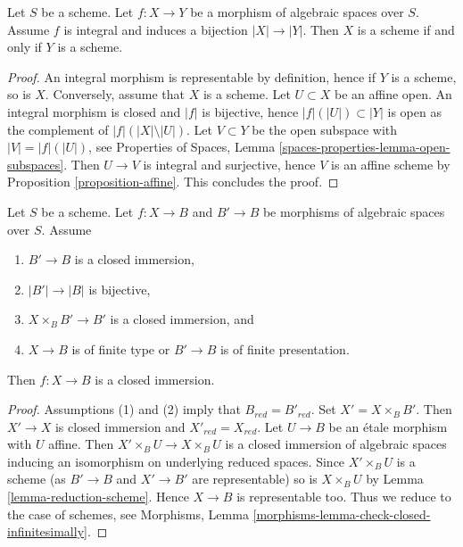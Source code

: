 \begin{lemma}
\label{lemma-integral-universally-bijective-scheme}
Let $S$ be a scheme. Let $f : X \to Y$ be a morphism of algebraic spaces
over $S$. Assume $f$ is integral and induces a bijection $|X| \to |Y|$.
Then $X$ is a scheme if and only if $Y$ is a scheme.
\end{lemma}

\begin{proof}
An integral morphism is representable by definition, hence if $Y$
is a scheme, so is $X$. Conversely, assume that $X$ is a scheme.
Let $U \subset X$ be an affine open. An integral morphism is
closed and $|f|$ is bijective, hence $|f|(|U|) \subset |Y|$
is open as the complement of $|f|(|X| \setminus |U|)$. Let
$V \subset Y$ be the open subspace with $|V| = |f|(|U|)$, see
Properties of Spaces, Lemma \ref{spaces-properties-lemma-open-subspaces}.
Then $U \to V$ is integral and surjective, hence
$V$ is an affine scheme by Proposition \ref{proposition-affine}.
This concludes the proof.
\end{proof}

\begin{lemma}
\label{lemma-check-closed-infinitesimally}
Let $S$ be a scheme.
Let $f : X \to B$ and $B' \to B$ be morphisms of algebraic spaces over $S$.
Assume
\begin{enumerate}
\item $B' \to B$ is a closed immersion,
\item $|B'| \to |B|$ is bijective,
\item $X \times_B B' \to B'$ is a closed immersion, and
\item $X \to B$ is of finite type or $B' \to B$ is of finite presentation.
\end{enumerate}
Then $f : X \to B$ is a closed immersion.
\end{lemma}

\begin{proof}
Assumptions (1) and (2) imply that $B_{red} = B'_{red}$.
Set $X' = X \times_B B'$. Then $X' \to X$ is closed immersion
and $X'_{red} = X_{red}$. Let $U \to B$ be an \'etale morphism
with $U$ affine. Then $X' \times_B U \to X \times_B U$ is a
closed immersion of algebraic spaces inducing an isomorphism
on underlying reduced spaces. Since $X' \times_B U$ is a scheme
(as $B' \to B$ and $X' \to B'$ are representable) so is
$X \times_B U$ by Lemma \ref{lemma-reduction-scheme}.
Hence $X \to B$ is representable too. Thus we reduce to the
case of schemes, see
Morphisms, Lemma \ref{morphisms-lemma-check-closed-infinitesimally}.
\end{proof}










